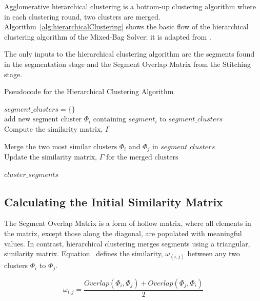 Agglomerative hierarchical clustering is a bottom-up clustering algorithm where in each clustering round, two clusters are merged.  Algorithm~\ref{alg:hierarchicalClustering} shows the basic flow of the hierarchical clustering algorithm of the Mixed-Bag Solver; it is adapted from \cite{tanIntroToDataMining}.  

The only inputs to the hierarchical clustering algorithm are the segments found in the segmentation stage and the Segment Overlap Matrix from the Stitching stage.

\begin{algorithm}
\caption{Pseudocode for the Hierarchical Clustering Algorithm}\label{alg:hierarchicalClustering}
\begin{algorithmic}[1]
	\State $\textit{segment\_clusters} = \{ \}$	
		\State $\text{add new segment cluster } \Phi_i \text{ containing } segment_i \text{ to } \textit{segment\_clusters}$
	\EndFor
    \State $\text{Compute the similarity matrix, } \Gamma$
\item[]
    	\State $\text{Merge the two most similar clusters } \Phi_i \text{ and } \Phi_j \text{ in } \textit{segment\_clusters}$
    	\State $\text{Update the similarity matrix, } \Gamma \text{ for the merged clusters}$
	\EndWhile
\item[]
    \State \Return $\textit{cluster\_segments}$
\EndFunction
\end{algorithmic}
\end{algorithm}

\subsection{Calculating the Initial Similarity Matrix}\label{sec:quantifyingSegmentSimilarity}

The Segment Overlap Matrix is a form of hollow matrix, where all elements in the matrix, except those along the diagonal, are populated with meaningful values.  In contrast, hierarchical clustering merges segments using a triangular, similarity matrix.  Equation~ defines the similarity, $\omega_(i,j)$ between any two clusters $\Phi_i$ to $\Phi_j$.

\begin{equation} \label{eq:segmentSimilarity}
\omega_{i,j} = \frac{Overlap(\Phi_i, \Phi_j) + Overlap(\Phi_j, \Phi_i)}{2} 
\end{equation}

